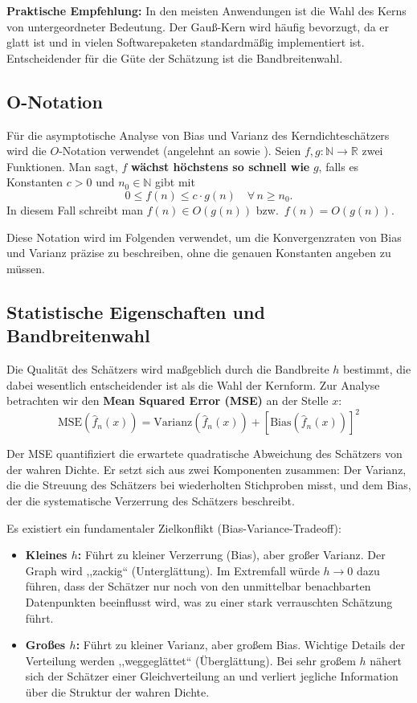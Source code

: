\documentclass[a4paper, 11pt]{scrartcl}
\begin{document}
\textbf{Praktische Empfehlung:} In den meisten Anwendungen ist die Wahl des Kerns von untergeordneter Bedeutung. Der Gauß-Kern wird häufig bevorzugt, da er glatt ist und in vielen Softwarepaketen standardmäßig implementiert ist. Entscheidender für die Güte der Schätzung ist die Bandbreitenwahl.

\subsection{O-Notation}

Für die asymptotische Analyse von Bias und Varianz des Kerndichteschätzers wird die $O$-Notation verwendet (angelehnt an \cite{SMI21} sowie \cite{dal2023probtest}). Seien $f, g : \mathbb{N} \to \mathbb{R}$ zwei Funktionen. Man sagt, $f$ \textbf{wächst höchstens so schnell wie} $g$, falls es Konstanten $c > 0$ und $n_0 \in \mathbb{N}$ gibt mit
\[
0 \leq f(n) \leq c \cdot g(n) \quad \forall\, n \geq n_0.
\]
In diesem Fall schreibt man $f(n) \in O(g(n))$ bzw.\ $f(n) = O(g(n))$.

Diese Notation wird im Folgenden verwendet, um die Konvergenzraten von Bias und Varianz präzise zu beschreiben, ohne die genauen Konstanten angeben zu müssen.

\subsection{Statistische Eigenschaften und Bandbreitenwahl}

Die Qualität des Schätzers wird maßgeblich durch die Bandbreite $h$ bestimmt, die dabei wesentlich entscheidender ist als die Wahl der Kernform. Zur Analyse betrachten wir den \textbf{Mean Squared Error (MSE)} an der Stelle $x$:
\begin{equation}
	\text{MSE}(\hat{f}_n(x)) = \text{Varianz}(\hat{f}_n(x)) + [\text{Bias}(\hat{f}_n(x))]^2
\end{equation}

Der MSE quantifiziert die erwartete quadratische Abweichung des Schätzers von der wahren Dichte. Er setzt sich aus zwei Komponenten zusammen: Der Varianz, die die Streuung des Schätzers bei wiederholten Stichproben misst, und dem Bias, der die systematische Verzerrung des Schätzers beschreibt.

Es existiert ein fundamentaler Zielkonflikt (Bias-Variance-Tradeoff):
\begin{itemize}
	\item \textbf{Kleines $h$:} Führt zu kleiner Verzerrung (Bias), aber großer Varianz. Der Graph wird ,,zackig`` (Unterglättung). Im Extremfall würde $h \to 0$ dazu führen, dass der Schätzer nur noch von den unmittelbar benachbarten Datenpunkten beeinflusst wird, was zu einer stark verrauschten Schätzung führt.
	\item \textbf{Großes $h$:} Führt zu kleiner Varianz, aber großem Bias. Wichtige Details der Verteilung werden ,,weggeglättet`` (Überglättung). Bei sehr großem $h$ nähert sich der Schätzer einer Gleichverteilung an und verliert jegliche Information über die Struktur der wahren Dichte.
\end{itemize}
\end{document}
